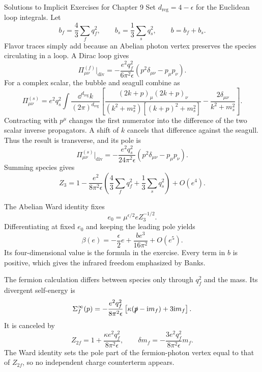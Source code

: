 \begin{bankssolutions}{Solutions to Implicit Exercises for Chapter 9}
Set $d_{\mathrm{reg}}=4-\epsilon$ for the Euclidean loop integrals.
Let
\[
  b_f=\frac43\sum_fq_f^2,
  \qquad b_s=\frac13\sum_sq_s^2,
  \qquad b=b_f+b_s.
\]
Flavor traces simply add because an Abelian photon vertex preserves the
species circulating in a loop.  A Dirac loop gives
\[
  \Pi^{(f)}_{\mu\nu}\big|_{\mathrm{div}}
  =-\frac{e^2q_f^2}{6\pi^2\epsilon}
  (p^2\delta_{\mu\nu}-p_\mu p_\nu).
\]
For a complex scalar, the bubble and seagull combine as
\[
  \Pi^{(s)}_{\mu\nu}=e^2q_s^2\int\frac{\dd^{d_{\mathrm{reg}}}k}{(2\pi)^{d_{\mathrm{reg}}}}
  \left[
  \frac{(2k+p)_\mu(2k+p)_\nu}
  {(k^2+m_s^2)[(k+p)^2+m_s^2]}
  -\frac{2\delta_{\mu\nu}}{k^2+m_s^2}
  \right].
\]
Contracting with $p^\mu$ changes the first numerator into the difference of
the two scalar inverse propagators.  A shift of $k$ cancels that difference
against the seagull.  Thus the result is transverse, and its pole is
\[
  \Pi^{(s)}_{\mu\nu}\big|_{\mathrm{div}}
  =-\frac{e^2q_s^2}{24\pi^2\epsilon}
  (p^2\delta_{\mu\nu}-p_\mu p_\nu).
\]
Summing species gives
\[
  Z_3=1-\frac{e^2}{8\pi^2\epsilon}
  \left(\frac43\sum_fq_f^2+\frac13\sum_sq_s^2\right)+O(e^4).
\]

The Abelian Ward identity fixes
\[
  e_0=\mu^{\epsilon/2}eZ_3^{-1/2}.
\]
Differentiating at fixed $e_0$ and keeping the leading pole yields
\[
  \beta(e)=-\frac\epsilon2e+\frac{b e^3}{16\pi^2}+O(e^5).
\]
Its four-dimensional value is the formula in the exercise.  Every term in
$b$ is positive, which gives the infrared freedom emphasized by Banks.

The fermion calculation differs between species only through $q_f^2$ and the
mass.  Its divergent self-energy is
\[
  \Sigma_f^\infty(p)=-\frac{e^2q_f^2}{8\pi^2\epsilon}
  \left[\kappa(\slashed p-\mathrm{i} m_f)+3\mathrm{i} m_f\right].
\]
It is canceled by
\[
  Z_{2f}=1+\frac{\kappa e^2q_f^2}{8\pi^2\epsilon},
  \qquad
  \delta m_f=-\frac{3e^2q_f^2}{8\pi^2\epsilon}m_f.
\]
The Ward identity sets the pole part of the fermion-photon vertex equal to
that of $Z_{2f}$, so no independent charge counterterm appears.


\end{bankssolutions}
